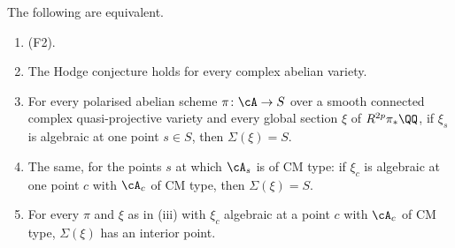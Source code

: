 \begin{theorem}\label{thm:f2propagation}
The following are equivalent.
\begin{enumerate}[label=\textup{(\roman*)},leftmargin=2.6em,itemsep=2pt]
\item \textup{(F2)}.
\item The Hodge conjecture holds for every complex abelian variety.
\item For every polarised abelian scheme $\pi\colon\cA\to S$ over a smooth
  connected complex quasi-projective variety and every global section $\xi$
  of $R^{2p}\pi_{*}\QQ$, if $\xi_{s}$ is algebraic at one point $s\in S$,
  then $\Sigma(\xi)=S$.
\item The same, for the points $s$ at which $\cA_{s}$ is of CM type: if
  $\xi_{c}$ is algebraic at one point $c$ with $\cA_{c}$ of CM type, then
  $\Sigma(\xi)=S$.
\item For every $\pi$ and $\xi$ as in \textup{(iii)} with $\xi_{c}$ algebraic
  at a point $c$ with $\cA_{c}$ of CM type, $\Sigma(\xi)$ has an interior
  point.
\end{enumerate}
\end{theorem}

